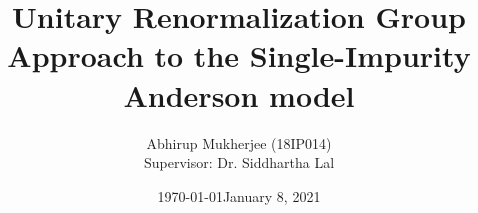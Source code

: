 \documentclass[aspectratio=169]{beamer}
\title{Unitary Renormalization Group Approach to the Single-Impurity Anderson model}
\subtitle{}
\date{\today}
\author{Abhirup Mukherjee (18IP014)\\[5mm]{Supervisor: Dr. Siddhartha Lal}}
\institute{IISER Kolkata}
\date{January 8, 2021}
\begin{document}
\begin{frame}
\maketitle
\end{frame}



\end{document}
